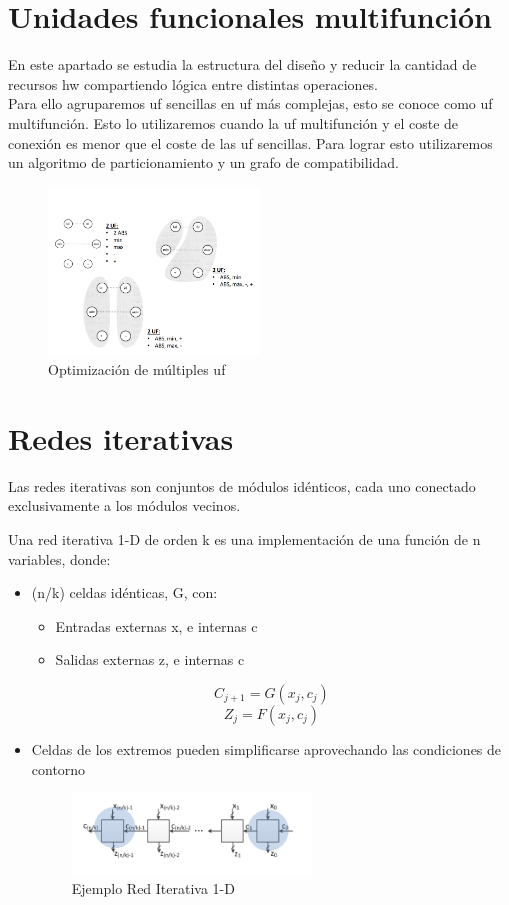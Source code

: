 \section{Unidades funcionales multifunción}
En este apartado se estudia la estructura del diseño y reducir la cantidad de recursos \gls{hw} compartiendo lógica entre distintas operaciones.\\
Para ello agruparemos \gls{uf} sencillas en \gls{uf} más complejas, esto se conoce como \gls{uf} multifunción. Esto lo utilizaremos cuando la \gls{uf} multifunción y el coste de conexión es menor que el coste de las \gls{uf} sencillas. Para lograr esto utilizaremos un algoritmo de particionamiento y un grafo de compatibilidad.
\begin{figure}[H]
	\centering
	\includegraphics[width=0.5\textwidth]{images/Tema_3/Optimizacion.PNG}
	\caption{Optimización de múltiples \gls{uf}}
\end{figure}

\section{Redes iterativas}
Las redes iterativas son conjuntos de módulos idénticos, cada uno conectado exclusivamente a los módulos vecinos.

Una red iterativa 1-D de orden k es una implementación de una función de n variables, donde:
\begin{itemize}
	\item (n/k) celdas idénticas, G, con:
	      \begin{itemize}
		      \item Entradas externas x, e internas c
		      \item Salidas externas z, e internas c
	      \end{itemize}
	      \[
		      C_{j+1}=G\left(x_{j},c_{j}\right)
	      \]
	      \[
		      Z_{j}=F\left(x_{j}, c_{j}\right)
	      \]

	\item Celdas de los extremos pueden simplificarse aprovechando las condiciones de contorno
	      \begin{figure}[H]
		      \centering
		      \includegraphics[width=0.6\textwidth]{images/Tema_3/Ejemplo_RI.PNG}
		      \caption{Ejemplo Red Iterativa 1-D}
	      \end{figure}
\end{itemize}

